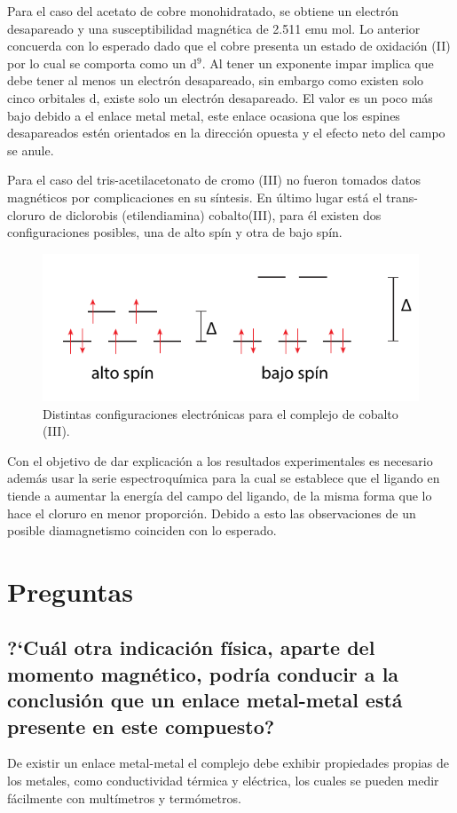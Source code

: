 \documentclass[fleqn,10pt]{SelfArx} %
\begin{document}
	Para el caso del acetato de cobre monohidratado, se obtiene un electr\'on desapareado y una susceptibilidad magn\'etica de 2.511 emu mol. Lo anterior concuerda con lo esperado dado que el cobre presenta un estado de oxidaci\'on (II) por lo cual se comporta como un d$^9$. Al tener un exponente impar implica que debe tener al menos un electr\'on desapareado, sin embargo como existen solo cinco orbitales d, existe solo un electr\'on desapareado. El valor es un poco m\'as bajo debido a el enlace metal metal, este enlace ocasiona que los espines desapareados est\'en orientados en la direcci\'on opuesta y el efecto neto del campo se anule.
	
	Para el caso del tris-acetilacetonato de cromo (III) no fueron tomados datos magn\'eticos por complicaciones en su s\'intesis. En \'ultimo lugar est\'a el trans-cloruro de diclorobis (etilendiamina) cobalto(III), para \'el existen dos configuraciones posibles, una de alto sp\'in y otra de bajo sp\'in.
	\begin{figure}[h]
	    \centering
	    \includegraphics[width=\linewidth]{images/CoSpin.pdf}
	    \caption{Distintas configuraciones electr\'onicas para el complejo de cobalto (III).}
	    \label{fig: CobaltSplit}
	\end{figure}
	
    Con el objetivo de dar explicaci\'on a los resultados experimentales es necesario adem\'as usar la serie espectroqu\'imica para la cual se establece que el ligando en tiende a aumentar la energ\'ia del campo del ligando, de la misma forma que lo hace el cloruro en menor proporci\'on. Debido a esto las observaciones de un posible diamagnetismo coinciden con lo esperado.
	
	\section{Preguntas}
	\subsection{?`Cu\'al otra indicaci\'on f\'isica, aparte del momento magn\'etico, podr\'ia conducir a la conclusi\'on que un enlace metal-metal est\'a presente en este compuesto?}
	De existir un enlace metal-metal el complejo debe exhibir propiedades propias de los metales, como conductividad t\'ermica y el\'ectrica, los cuales se pueden medir f\'acilmente con mult\'imetros y term\'ometros.
	
\end{document}
